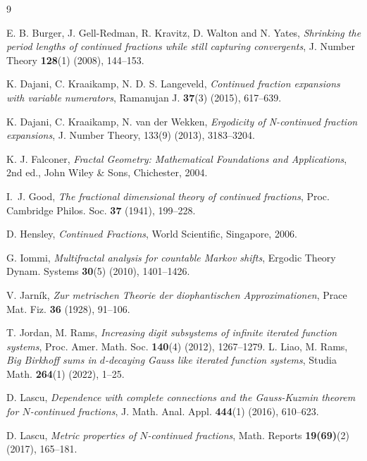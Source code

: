 \documentclass[12pt]{article}
\numberwithin{equation}{section}
\begin{document}
\begin{thebibliography}{9}

E. B. Burger, J. Gell-Redman, R. Kravitz, D. Walton and N. Yates,
\textit{Shrinking the period lengths of continued fractions while still capturing convergents},
J. Number Theory \textbf{128}(1) (2008), 144--153.


{
K. Dajani, C. Kraaikamp, N. D. S. Langeveld, \textit{Continued fraction expansions with variable numerators}, Ramanujan J. \textbf{37}(3) (2015), 617--639.}


{
K. Dajani, C. Kraaikamp, N. van der Wekken, \textit{Ergodicity of N-continued fraction
expansions}, J. Number Theory, 133(9) (2013), 3183–3204.}


K. J. Falconer,
\textit{Fractal Geometry: Mathematical Foundations and Applications},
2nd ed., John Wiley \& Sons, Chichester, 2004.


I.~J. Good,
\textit{The fractional dimensional theory of continued fractions},
Proc. Cambridge Philos. Soc. \textbf{37} (1941), 199--228.


{
D. Hensley,
\textit{Continued Fractions},
World Scientific, Singapore, 2006.}


{
G. Iommi,
\textit{Multifractal analysis for countable Markov shifts},
Ergodic Theory Dynam. Systems \textbf{30}(5) (2010), 1401--1426.}

V. Jarník,
\textit{Zur metrischen Theorie der diophantischen Approximationen},
Prace Mat. Fiz. \textbf{36} (1928), 91--106.

{
T. Jordan, M. Rams,
\textit{Increasing digit subsystems of infinite iterated function systems},
Proc. Amer. Math. Soc. \textbf{140}(4) (2012), 1267--1279.
%
L. Liao, M. Rams,
\textit{Big Birkhoff sums in $d$-decaying Gauss like iterated function systems},
Studia Math. \textbf{264}(1) (2022), 1--25.
}

D. Lascu,
\textit{Dependence with complete connections and the Gauss-Kuzmin theorem for $N$-continued fractions},
J. Math. Anal. Appl. \textbf{444}(1) (2016), 610--623.

D. Lascu,
\textit{Metric properties of $N$-continued fractions},
Math. Reports \textbf{19(69)}(2) (2017), 165--181.



\end{thebibliography}
\end{document}
